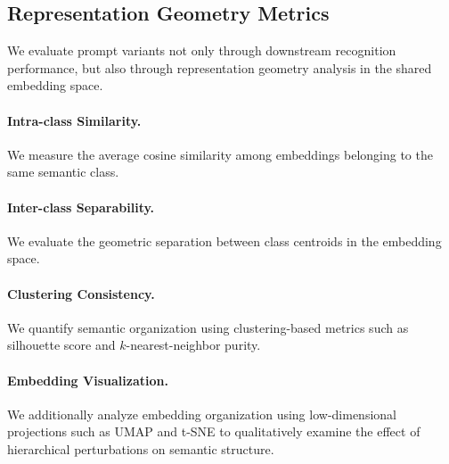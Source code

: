 \subsection{Representation Geometry Metrics}

We evaluate prompt variants not only through downstream recognition performance, but also through representation geometry analysis in the shared embedding space.

\paragraph{Intra-class Similarity.}
We measure the average cosine similarity among embeddings belonging to the same semantic class.

\paragraph{Inter-class Separability.}
We evaluate the geometric separation between class centroids in the embedding space.

\paragraph{Clustering Consistency.}
We quantify semantic organization using clustering-based metrics such as silhouette score and $k$-nearest-neighbor purity.

\paragraph{Embedding Visualization.}
We additionally analyze embedding organization using low-dimensional projections such as UMAP and t-SNE to qualitatively examine the effect of hierarchical perturbations on semantic structure.
